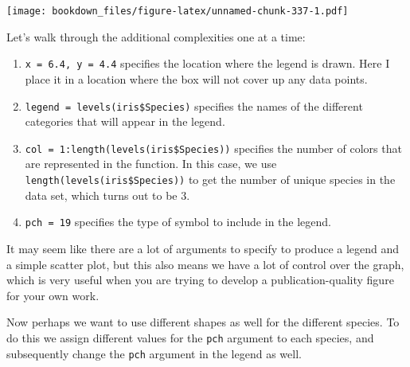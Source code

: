 \documentclass[
]{krantz}
\makeatletter
\newenvironment{Shaded}{\begin{snugshade}}{\end{snugshade}}
\newcommand{\DataTypeTok}[1]{\textcolor[rgb]{0.27,0.27,0.27}{#1}}
\newcommand{\DecValTok}[1]{\textcolor[rgb]{0.06,0.06,0.06}{#1}}
\newcommand{\FloatTok}[1]{\textcolor[rgb]{0.06,0.06,0.06}{#1}}
\newcommand{\KeywordTok}[1]{\textcolor[rgb]{0.27,0.27,0.27}{\textbf{#1}}}
\newcommand{\NormalTok}[1]{#1}
\newcommand{\OperatorTok}[1]{\textcolor[rgb]{0.43,0.43,0.43}{\textbf{#1}}}
\newcommand{\StringTok}[1]{\textcolor[rgb]{0.5,0.5,0.5}{#1}}
\providecommand{\tightlist}{%
  \setlength{\itemsep}{0pt}\setlength{\parskip}{0pt}}
\newenvironment{kframe}{%
\medskip{}
\setlength{\fboxsep}{.8em}
 \def\at@end@of@kframe{}%
 \ifinner\ifhmode%
  \def\at@end@of@kframe{\end{minipage}}%
  \begin{minipage}{\columnwidth}%
 \fi\fi%
 \def\FrameCommand##1{\hskip\@totalleftmargin \hskip-\fboxsep
 \colorbox{shadecolor}{##1}\hskip-\fboxsep
     \hskip-\linewidth \hskip-\@totalleftmargin \hskip\columnwidth}%
 \MakeFramed {\advance\hsize-\width
   \@totalleftmargin\z@ \linewidth\hsize
   \@setminipage}}%
 {\par\unskip\endMakeFramed%
 \at@end@of@kframe}
\renewenvironment{Shaded}{\begin{kframe}}{\end{kframe}}
\makeatother
\begin{document}
\texttt{[image: bookdown\_files/figure-latex/unnamed-chunk-337-1.pdf]}

Let's walk through the additional complexities one at a time:

\begin{enumerate}
\def\labelenumi{\arabic{enumi}.}
\tightlist
\item
  \texttt{x\ =\ 6.4,\ y\ =\ 4.4} specifies the location where the legend is drawn. Here I place it in a location where the box will not cover up any data points.
\item
  \texttt{legend\ =\ levels(iris\$Species)} specifies the names of the different categories that will appear in the legend.
\item
  \texttt{col\ =\ 1:length(levels(iris\$Species))} specifies the number of colors that are represented in the function. In this case, we use \texttt{length(levels(iris\$Species))} to get the number of unique species in the data set, which turns out to be 3.
\item
  \texttt{pch\ =\ 19} specifies the type of symbol to include in the legend.
\end{enumerate}

It may seem like there are a lot of arguments to specify to produce a legend and a simple scatter plot, but this also means we have a lot of control over the graph, which is very useful when you are trying to develop a publication-quality figure for your own work.

Now perhaps we want to use different shapes as well for the different species. To do this we assign different values for the \texttt{pch} argument to each species, and subsequently change the \texttt{pch} argument in the legend as well.

\begin{Shaded}
\end{Shaded}
\end{document}
